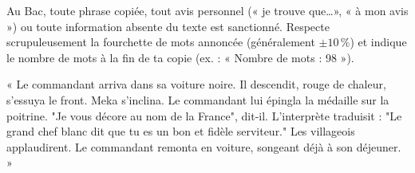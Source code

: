 \documentclass[11pt]{article}
\begin{document}
\begin{attention}
Au Bac, toute phrase copiée, tout avis personnel (« je trouve que\ldots », « à mon avis ») ou toute information absente du texte est sanctionné. Respecte scrupuleusement la fourchette de mots annoncée (généralement $\pm 10\,\%$) et indique le nombre de mots à la fin de ta copie (ex. : « Nombre de mots : 98 »).
\end{attention}

\begin{exemplebox}
« Le commandant arriva dans sa voiture noire. Il descendit, rouge de chaleur, s'essuya le front. Meka s'inclina. Le commandant lui épingla la médaille sur la poitrine. "Je vous décore au nom de la France", dit-il. L'interprète traduisit : "Le grand chef blanc dit que tu es un bon et fidèle serviteur." Les villageois applaudirent. Le commandant remonta en voiture, songeant déjà à son déjeuner. »
\end{exemplebox}
\end{document}
